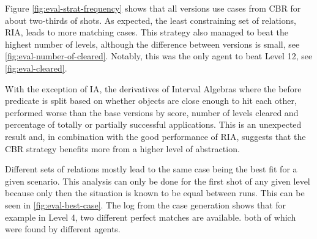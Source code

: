 Figure \ref{fig:eval-strat-frequency} shows that all versions use cases from \ac{CBR} for about two-thirds of shots. As expected, the least constraining set of relations, \ac{RIA}, leads to more matching cases. This strategy also managed to beat the highest number of levels, although the difference between versions is small, see \ref{fig:eval-number-of-cleared}. Notably, this was the only agent to beat Level 12, see \ref{fig:eval-cleared}.

With the exception of \ac{IA}, the derivatives of Interval Algebras where the before predicate is split based on whether objects are close enough to hit each other, performed worse than the base versions by score, number of levels cleared and percentage of totally or partially successful applications. This is an unexpected result and, in combination with the good performance of \ac{RIA}, suggests that the \ac{CBR} strategy benefits more from a higher level of abstraction.

Different sets of relations mostly lead to the same case being the best fit for a given scenario. This analysis can only be done for the first shot of any given level because only then the situation is known to be equal between runs. This can be seen in \ref{fig:eval-best-case}. The log from the case generation shows that for example in Level 4, two different perfect matches are available. both of which were found by different agents.


